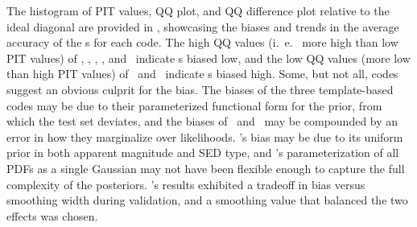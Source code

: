 The histogram of PIT values, QQ plot, and QQ difference plot relative to the ideal diagonal are provided in , showcasing the biases and trends in the average accuracy of the \pzpdf s for each code.
The high QQ values (i.~e.~ more high than low PIT values) of \bpz, \cmnn, \delight, \eazy, and \gpz\ indicate \pzpdf s biased low, and the low QQ values (more low than high PIT values) of \skynet\ and \tpz\ indicate \pzpdf s biased high.
Some, but not all, codes suggest an obvious culprit for the bias.
The biases of the three template-based codes may be due to their parameterized functional form for the prior, from which the test set deviates, and the biases of \eazy\ and \lephare\ may be compounded by an error in how they marginalize over likelihoods.
\delight's bias may be due to its uniform prior in both apparent magnitude and SED type, and \gpz's parameterization of all PDFs as a single Gaussian may not have been flexible enough to capture the full complexity of the posteriors.  
\tpz's results exhibited a tradeoff in bias versus smoothing width during validation, and a smoothing value that balanced the two effects was chosen.

